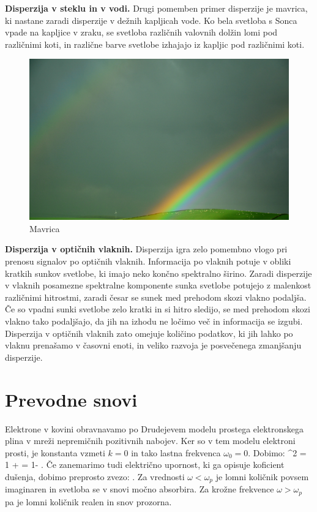 \begin{example}{\bf Disperzija v steklu in v vodi.}
Drugi pomemben primer disperzije je mavrica, ki nastane zaradi
disperzije v dežnih kapljicah vode. Ko bela svetloba s Sonca vpade
na kapljice v zraku, se svetloba različnih valovnih dolžin 
lomi pod različnimi koti, in različne barve svetlobe izhajajo
iz kapljic pod različnimi koti. 
\begin{figure}[ht]
\centering
\includegraphics[width=7truecm]{slike/09_mavrica_photo.jpg}
\caption{Mavrica}
\label{fig:09_mavrica}
\end{figure}
\end{example}

\begin{example}{\bf Disperzija v optičnih vlaknih.}
Disperzija igra zelo pomembno vlogo pri prenosu signalov
po optičnih vlaknih. Informacija po vlaknih potuje
v obliki kratkih sunkov svetlobe, ki imajo neko
končno spektralno širino. Zaradi disperzije v vlaknih 
posamezne spektralne komponente sunka svetlobe
potujejo z malenkost različnimi hitrostmi, zaradi 
česar se sunek med prehodom skozi vlakno podaljša. 
Če so vpadni sunki svetlobe zelo kratki in si hitro sledijo,
se med prehodom skozi vlakno tako podaljšajo, da jih na izhodu
ne ločimo več in informacija se izgubi. 
Disperzija v optičnih vlaknih zato omejuje količino 
podatkov, ki jih lahko po vlaknu prenašamo v časovni enoti,
in veliko razvoja je posvečenega zmanjšanju disperzije.
\end{example}

\section{Prevodne snovi}
Elektrone v kovini obravnavamo po Drudejevem modelu prostega elektronskega plina
v mreži nepremičnih pozitivnih nabojev. Ker so v tem modelu elektroni prosti,
je konstanta vzmeti $k=0$ in tako lastna frekvenca $\omega_0=0$. Dobimo:
\beq
{}^2 = 1 +  = 1- 
.
\label{eq:09_36}
\eeq
Če zanemarimo tudi električno upornost, ki ga opisuje koficient dušenja, dobimo
preprosto zvezo:
\beq
{} \approx {}.
\label{eq:09_37}
\eeq
Za vrednosti $\omega < \omega_p$ je lomni količnik povsem imaginaren in svetloba se v snovi
močno absorbira. Za krožne frekvence $\omega > \omega_p$ pa je lomni količnik realen 
in snov prozorna. 

